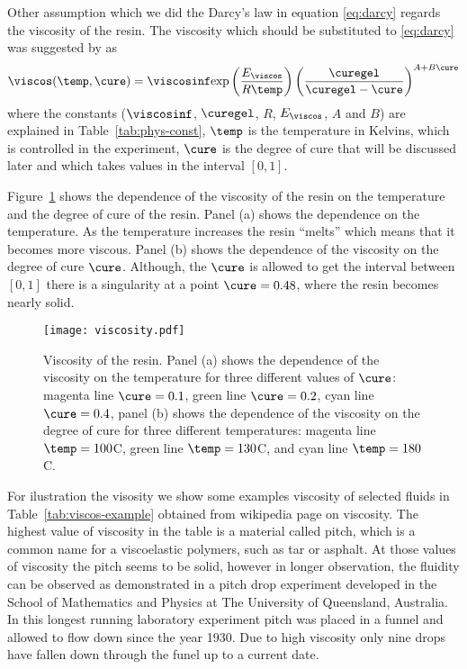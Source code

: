 \documentclass[twoside,a4paper,12pt]{article}
\newcommand{\figref}[1]{Figure~\ref{#1}}
\newcommand{\tabref}[1]{Table~\ref{#1}}
\newcommand{\note}[1]{{\color{red}(#1)}}
\begin{document}
%
Other assumption which we did the Darcy's law in equation
\eqref{eq:darcy} regards the viscosity of the resin.  The viscosity
which should be substituted to \eqref{eq:darcy} was suggested by  \citet{Kenny1992}
as
%
\begin{align}
  \viscos(\temp,\cure) =
  \viscosinf \exp{\frac{E_\viscos }{R \temp}} \left(\frac{\curegel}{\curegel - \cure}\right)^{A+B\cure} \label{eq:viscosity}
\end{align}
%
where the constants ($\viscosinf$, $\curegel$, $R$, $E_\viscos$, $A$ and
$B$) are explained in \tabref{tab:phys-const}, %
$\temp$ is the temperature in Kelvins, which is controlled in the
experiment, $\cure$ is the degree of cure that will be discussed
later and which takes values in the interval $[0,1]$.

\figref{fig:viscos} shows the dependence of the viscosity of the resin
on the temperature and the degree of cure of the resin. Panel (a)
shows the dependence on the temperature. As the temperature increases
the resin ``melts'' which means that it becomes more viscous. Panel
(b) shows the dependence of the viscosity on the degree of cure
$\cure$. Although, the $\cure$ is allowed to get the interval between
$[0,1]$ there is a singularity at a point $\cure = 0.48$, where the
resin becomes nearly solid.

\begin{figure}
  \centering
  \texttt{[image: viscosity.pdf]}
  \caption{Viscosity of the resin. Panel (a) shows the dependence of the
    viscosity on the temperature for three different values of
    $\cure$: magenta line $\cure=0.1$, green line $\cure=0.2$, cyan
    line $\cure=0.4$, panel (b) shows the dependence of the viscosity
    on the degree of cure for three different temperatures: magenta
    line $\temp = 100$\degree C, green line $\temp = 130$\degree C, and cyan line
    $\temp = 180$\degree C.}
  \label{fig:viscos}
\end{figure}

For ilustration the visosity we show some examples viscosity of
selected fluids in \tabref{tab:viscos-example} obtained from wikipedia
page on viscosity. The highest value of viscosity in the table is a
material called pitch, which is a common name for a viscoelastic
polymers, such as tar or asphalt. At those values of viscosity the
pitch seems to be solid, however in longer observation, the fluidity
can be observed as demonstrated in a pitch drop experiment developed
in the School of Mathematics and Physics at The University of
Queensland, Australia. In this longest running laboratory experiment
pitch was placed in a funnel and allowed to flow down since the year
1930. Due to high viscosity only nine drops have fallen down through
the funel up to a current date.
\end{document}
